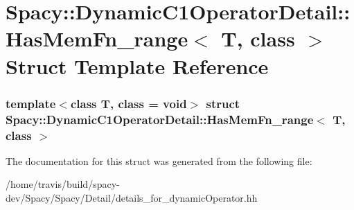 \hypertarget{structSpacy_1_1DynamicC1OperatorDetail_1_1HasMemFn__range}{\section{\-Spacy\-:\-:\-Dynamic\-C1\-Operator\-Detail\-:\-:\-Has\-Mem\-Fn\-\_\-range$<$ \-T, class $>$ \-Struct \-Template \-Reference}
\label{structSpacy_1_1DynamicC1OperatorDetail_1_1HasMemFn__range}
}
\subsubsection*{template$<$class T, class = void$>$ struct Spacy\-::\-Dynamic\-C1\-Operator\-Detail\-::\-Has\-Mem\-Fn\-\_\-range$<$ T, class $>$}



\-The documentation for this struct was generated from the following file\-:\begin{DoxyCompactItemize}
\item 
/home/travis/build/spacy-\/dev/\-Spacy/\-Spacy/\-Detail/details\-\_\-for\-\_\-dynamic\-Operator.\-hh\end{DoxyCompactItemize}
